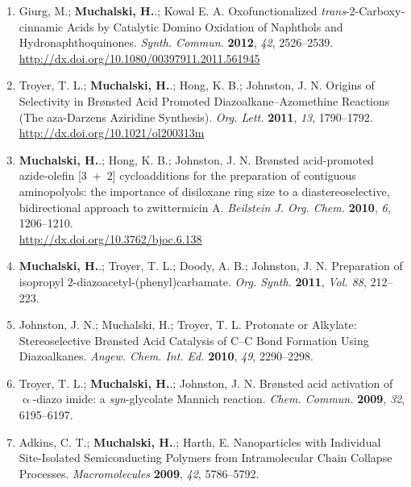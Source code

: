 \documentclass[11pt,letterpaper]{article}
\begin{document}
\begin{enumerate}[itemindent=0pt]
  \item Giurg, M.; \textbf{Muchalski, H.}.; Kowal E. A. Oxofunctionalized  \textit{trans}-2-Carboxy-cinnamic Acids by Catalytic Domino Oxidation of Naphthols and Hydronaphthoquinones. \textit{Synth. Commun.} \textbf{2012}, \textit{42}, 2526--2539. \\
  \href{http://dx.doi.org/10.1080/00397911.2011.561945}{http://dx.doi.org/10.1080/00397911.2011.561945}

  \item Troyer, T. L.; \textbf{Muchalski, H.}.; Hong, K. B.; Johnston, J. N. Origins of Selectivity in Br\o nsted Acid Promoted Diazoalkane--Azomethine Reactions (The aza-Darzens Aziridine Synthesis). \textit{Org. Lett.} \textbf{2011}, \textit{13}, 1790--1792. \\
  \href{http://dx.doi.org/10.1021/ol200313m}{http://dx.doi.org/10.1021/ol200313m}

  \item \textbf{Muchalski, H.}.; Hong, K. B.; Johnston, J. N. Br\o nsted acid-promoted azide-olefin [3~+~2] cycloadditions for the preparation of contiguous aminopolyols: the importance of disiloxane ring size to a diastereoselective, bidirectional approach to zwittermicin A. \textit{Beilstein J. Org. Chem.} \textbf{2010}, \textit{6}, 1206--1210. \\
  \href{http://dx.doi.org/10.3762/bjoc.6.138}{http://dx.doi.org/10.3762/bjoc.6.138}  

  \item \textbf{Muchalski, H.}.; Troyer, T. L.; Doody, A. B.; Johnston, J. N. Preparation of isopropyl 2-diazoacetyl-(phenyl)carbamate. \textit{Org. Synth.} \textbf{2011}, \textit{Vol. 88}, 212--223.

  \item Johnston, J. N.; Muchalski, H.; Troyer, T. L. Protonate or Alkylate: Stereoselective Br\o nsted Acid Catalysis of C--C Bond Formation Using Diazoalkanes. \textit{Angew. Chem. Int. Ed.} \textbf{2010}, \textit{49}, 2290--2298.

  \item Troyer, T. L.; \textbf{Muchalski, H.}.; Johnston, J. N. Br\o nsted acid activation of $\upalpha$-diazo imide: a \textit{syn}-glycolate Mannich reaction. \textit{Chem. Commun.} \textbf{2009}, \textit{32}, 6195--6197.

  \item Adkins, C. T.; \textbf{Muchalski, H.}.; Harth, E. Nanoparticles with Individual Site-Isolated Semiconducting Polymers from Intramolecular Chain Collapse Processes. \textit{Macromolecules} \textbf{2009}, \textit{42}, 5786--5792.
  

\end{enumerate}
\end{document}
